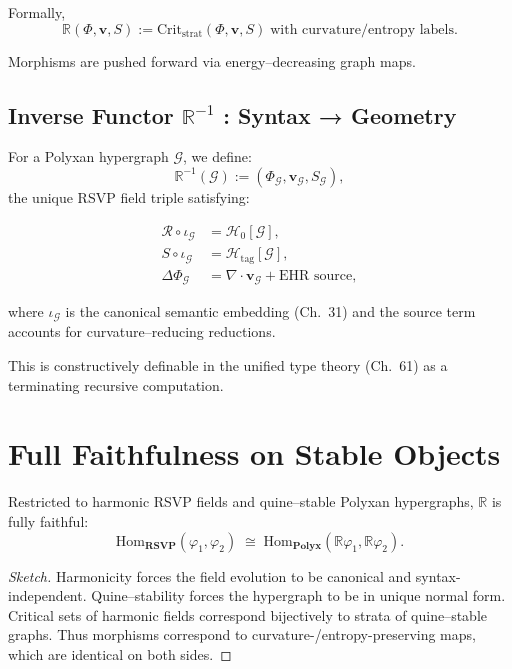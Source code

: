 Formally,
\[
\mathbb{R}(\Phi,\mathbf{v},S)
  := \mathrm{Crit}_{\mathrm{strat}}(\Phi,\mathbf{v},S)
     \;\text{with curvature/entropy labels}.
\]

Morphisms are pushed forward via energy--decreasing graph maps.

\subsection{Inverse Functor \texorpdfstring{$\mathbb{R}^{-1}$}{R⁻¹} : Syntax → Geometry}

For a Polyxan hypergraph $\mathcal{G}$,
we define:
\[
\mathbb{R}^{-1}(\mathcal{G})
  := (\Phi_{\mathcal{G}},\mathbf{v}_{\mathcal{G}},S_{\mathcal{G}}),
\]
the unique RSVP field triple satisfying:

\begin{align}
\mathcal{R}\circ \iota_{\mathcal{G}} &= \mathcal{H}_0[\mathcal{G}], \\
S\circ \iota_{\mathcal{G}} &= \mathcal{H}_{\mathrm{tag}}[\mathcal{G}], \\
\Delta \Phi_{\mathcal{G}} &= \nabla\cdot\mathbf{v}_{\mathcal{G}} + \text{EHR source},
\end{align}

where $\iota_{\mathcal{G}}$ is the canonical semantic embedding (Ch.~31)
and the source term accounts for curvature--reducing reductions.

This is constructively definable in the unified type theory (Ch.~61)
as a terminating recursive computation.

\section{Full Faithfulness on Stable Objects}

\begin{theorem}
\label{thm:full-faithful}
Restricted to harmonic RSVP fields and quine--stable Polyxan hypergraphs,
$\mathbb{R}$ is fully faithful:
\[
\mathrm{Hom}_{\mathbf{RSVP}}(\varphi_1,\varphi_2)
  \;\cong\;
\mathrm{Hom}_{\mathbf{Polyx}}(\mathbb{R}\varphi_1,\mathbb{R}\varphi_2).
\]
\end{theorem}

\begin{proof}[Sketch]
Harmonicity forces the field evolution to be canonical and syntax-independent.
Quine--stability forces the hypergraph to be in unique normal form.
Critical sets of harmonic fields correspond bijectively to strata of quine--stable graphs.
Thus morphisms correspond to curvature-/entropy-preserving maps,
which are identical on both sides.
\end{proof}

